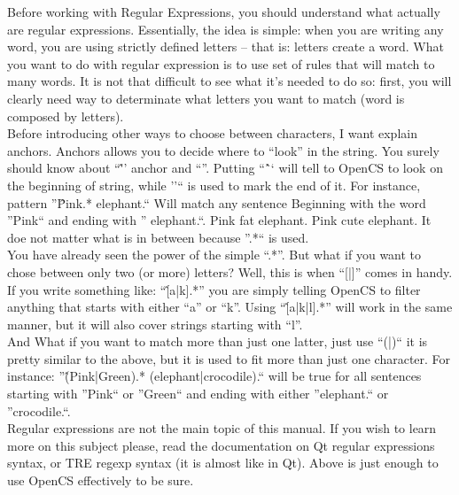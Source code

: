 Before working with Regular Expressions, you should understand what actually are regular expressions. Essentially, the idea is simple: when you are writing any word, you are using strictly defined letters -- that is: letters create a word. What you want to do with regular expression is to use set of rules that will match to many words. It is not that difficult to see what it's needed to do so: first, you will clearly need way to determinate what letters you want to match (word is composed by letters).\\

Before introducing other ways to choose between characters, I want explain anchors. Anchors allows you to decide where to ``look'' in the string. You surely should know about ``\^'' anchor and ``\textdollar''. Putting ``\^`` will tell to Open{CS} to look on the beginning of string, while ''\textdollar`` is used to mark the end of it. For instance, pattern ''\^Pink.* elephant.\textdollar`` Will match any sentence Beginning with the word ''Pink`` and ending with '' elephant.``. Pink fat elephant. Pink cute elephant. It doe not matter what is in between because ''.*`` is used.\\

You have already seen the power of the simple ``.*''. But what if you want to chose between only two (or more) letters? Well, this is when ``[|]'' comes in handy. If you write something like: ``\^[a|k].*'' you are simply telling Open{CS} to filter anything that starts with either ``a'' or ``k''. Using ``\^[a|k|l].*'' will work in the same manner, but it will also cover strings starting with ``l''.\\

And What if you want to match more than just one latter, just use ``(|)`` it is pretty similar to the above, but it is used to fit more than just one character. For instance: ''\^(Pink|Green).* (elephant|crocodile).\textdollar`` will be true for all sentences starting with ''Pink`` or ''Green`` and ending with either ''elephant.`` or ''crocodile.``.\\

Regular expressions are not the main topic of this manual. If you wish to learn more on this subject please, read the documentation on Qt regular expressions syntax, or TRE regexp syntax (it is almost like in Qt). Above is just enough to use Open{CS} effectively to be sure.\\

